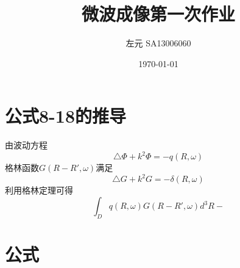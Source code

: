 \documentclass[a4paper]{article}
\title{微波成像第一次作业}
\author{左元  SA13006060}
\date{\today}
\begin{document}
\maketitle

\section{公式8-18的推导}
由波动方程
\begin{equation}
	\triangle \Phi + k^2 \Phi = - q(R,\omega)
\end{equation}
格林函数$G(R-R',\omega)$满足
\begin{equation}
	\triangle G + k^2 G = - \delta(R,\omega)
\end{equation}
利用格林定理可得
\begin{equation}
	\int_D q(R,\omega) G(R - R',\omega) d^3 R - 
\end{equation}
\section{公式}
\end{document}

